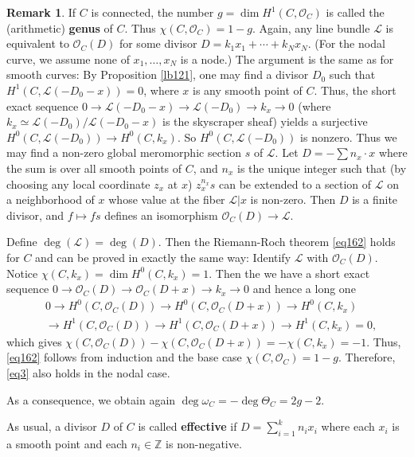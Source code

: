 \documentclass[12pt,b5paper,notitlepage]{report}
\theoremstyle{definition}
\newtheorem{rem}[df]{Remark}
\theoremstyle{plain}
\newcommand{\scr}{\mathscr}
\newcommand{\Zbb}{\mathbb Z}
\numberwithin{equation}{section}
\begin{document}
\begin{rem}\label{lb63}
If $C$ is connected, the number $g=\dim H^1(C,\scr O_C)$ is called the (arithmetic) \textbf{genus} of $C$. Thus $\chi(C,\scr O_C)=1-g$. Again, any line bundle $\scr L$ is equivalent to $\scr O_C(D)$ for some divisor $D=k_1x_1+\cdots +k_Nx_N$. (For the nodal curve, we assume none of $x_1,\dots,x_N$ is a node.) The argument is the same as for smooth curves:  By Proposition \ref{lb121}, one may find a divisor $D_0$ such that $H^1(C,\scr L(-D_0-x))=0$, where $x$ is any smooth point of $C$. Thus, the short exact sequence $0\rightarrow \scr L(-D_0-x)\rightarrow\scr L(-D_0)\rightarrow k_x\rightarrow 0$ (where $k_x\simeq\scr L(-D_0)/\scr L(-D_0-x)$ is the skyscraper sheaf) yields a surjective $H^0(C,\scr L(-D_0))\rightarrow H^0(C,k_x)$. So $H^0(C,\scr L(-D_0))$ is nonzero. Thus we may find a non-zero global meromorphic section $s$ of $\scr L$. Let $D=-\sum n_x\cdot x$ where the sum is over all smooth points of $C$, and $n_x$ is the unique integer such that (by choosing any local coordinate $z_x$ at $x$) $z_x^{n_x}s$ can be extended to a section of $\scr L$ on a neighborhood of $x$ whose value at the fiber $\scr L|x$ is non-zero. Then  $D$ is a finite divisor, and $f\mapsto fs$ defines an isomorphism $\scr O_C(D)\rightarrow \scr L$.

Define $\deg(\scr L)=\deg(D)$. Then the Riemann-Roch theorem \eqref{eq162} holds for $C$ and can be proved in exactly the same way: Identify $\scr L$ with $\scr O_C(D)$. Notice $\chi(C,k_x)=\dim H^0(C,k_x)=1$. Then the we have a short exact sequence $0\rightarrow\scr O_C(D)\rightarrow\scr O_C(D+x)\rightarrow k_x\rightarrow 0$ and hence a long one
\begin{align*}
&0\rightarrow H^0(C,\scr O_C(D))\rightarrow H^0(C,\scr O_C(D+x))\rightarrow H^0(C,k_x)\\
&\rightarrow  H^1(C,\scr O_C(D))\rightarrow H^1(C,\scr O_C(D+x))\rightarrow H^1(C,k_x)=0,
\end{align*}
which gives $\chi(C,\scr O_C(D))-\chi(C,\scr O_C(D+x))=-\chi(C,k_x)=-1$. Thus, \eqref{eq162} follows from induction and the base case $\chi(C,\scr O_C)=1-g$. Therefore, \eqref{eq3} also holds in the nodal case. 

As a consequence, we obtain again $\deg\omega_C=-\deg\Theta_C=2g-2$.
\end{rem}

As usual, a divisor $D$ of $C$ is called \textbf{effective} if $D=\sum_{i=1}^kn_ix_i$ where each $x_i$ is a smooth point and each $n_i\in\Zbb$ is non-negative.
\end{document}

